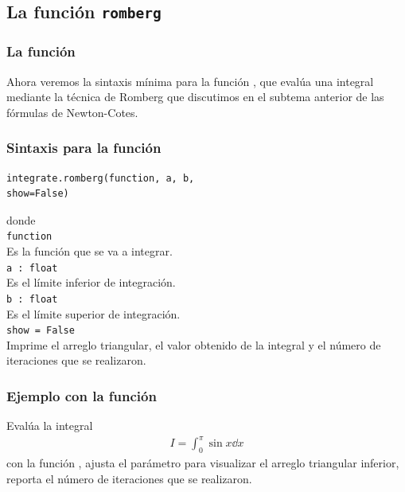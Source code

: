 \subsection{La función \texttt{romberg}}
\begin{frame}
\frametitle{La función }
Ahora veremos la sintaxis mínima para la función , que evalúa una integral mediante la técnica de Romberg que discutimos en el subtema anterior de las fórmulas de Newton-Cotes.
\end{frame}
\begin{frame}[fragile]
\frametitle{Sintaxis para la función }
\begin{verbatim}
integrate.romberg(function, a, b, 
show=False)
\end{verbatim}
\fontsize{12}{12}\selectfont
donde
\\
\verb|function|
\\
Es la función que se va a integrar.
\\
\medskip
\verb|a : float|
\\
Es el límite inferior de integración.
\\
\medskip
\verb|b : float|
\\
Es el límite superior de integración.
\\
\medskip
\verb|show = False|
\\
Imprime el arreglo triangular, el valor obtenido de la integral y el número de iteraciones que se realizaron.
\end{frame}
\begin{frame}
\frametitle{Ejemplo con la función }
Evalúa la integral
\begin{align*}
I = \int_{0}^{\pi} \sin x \dd{x}
\end{align*}
con la función , ajusta el parámetro para visualizar el arreglo triangular inferior, reporta el número de iteraciones que se realizaron.
\end{frame}
